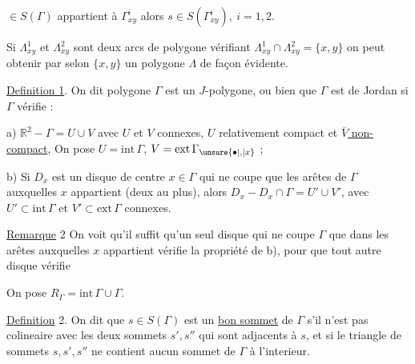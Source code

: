 $\in S(\Gamma)$ appartient à $\Gamma^{i}_{xy}$ alors $s\in S(\Gamma^{i}_{xy}),\ i=1,2$.

Si $\Lambda^{1}_{xy}$ et $\Lambda^{2}_{xy}$ sont deux arcs de polygone vérifiant \margin{$\bullet$}$\Lambda^{1}_{xy}\cap\Lambda^{2}_{xy}=\{x,y\}$ on peut obtenir par  selon $\{x,y\}$ un polygone $\Lambda$ de façon évidente.

%
\margin{$\bullet$}\uline{Definition 1}. On dit  polygone $\Gamma$ est un $J$-polygone, ou bien que $\Gamma$ est de Jordan si $\Gamma$ vérifie :

a) $\mathbb{R}^{2}-\Gamma=U\cup V$ avec $U$ et $V$ connexes, $U$ relativement compact et \uline{$\overline{V}$ non-compact}, On pose $U=\mathrm{int}\,\Gamma$, $V=\mathrm{ext}\,\Gamma_{\unsure{\bullet|,|x}}$ ;

b) Si $D_{x}$ est un disque de centre $x\in\Gamma$ qui ne coupe que les arêtes de $\Gamma$ auxquelles $x$ appartient (deux au plus), alors $D_{x}-D_{x}\cap\Gamma=U'\cup V'$, avec $U'\subset\mathrm{int}\,\Gamma$ et $V'\subset\mathrm{ext}\,\Gamma$ connexes.

%
\uline{Remarque} 2 On voit qu'il suffit qu'un seul disque  qui ne coupe $\Gamma$  que dans les  arêtes auxquelles $x$ appartient vérifie la propriété de b), pour que tout autre  disque  vérifie 

On pose $R_{\Gamma}=\mathrm{int}\,\Gamma\cup\Gamma$.

\margin{$\cdot$}\uline{Definition} 2. On dit que $s\in S(\Gamma)$ est un \uline{bon sommet} de $\Gamma$ s'il \margin{,}n'est pas colineaire avec les deux sommets $s',s''$ qui sont adjacents à $s$, et si le triangle de sommets $s,s',s''$ ne contient aucun sommet de $\Gamma$ à l'interieur. 

